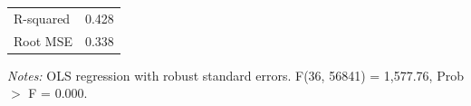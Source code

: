 \begin{landscape}
\begin{table}[H]
\begin{threeparttable}
\begin{tabular}{lccc}
            R-squared       & \multicolumn{3}{c}{0.428} \\
            Root MSE        & \multicolumn{3}{c}{0.338} \\
            \bottomrule
        \end{tabular}
        \begin{tablenotes}
            \small
            \item \textit{Notes:} OLS regression with robust standard
            errors. F(36, 56841) = 1,577.76, Prob $>$ F = 0.000.
        \end{tablenotes}
    \end{threeparttable}
\end{table}
\end{landscape}



